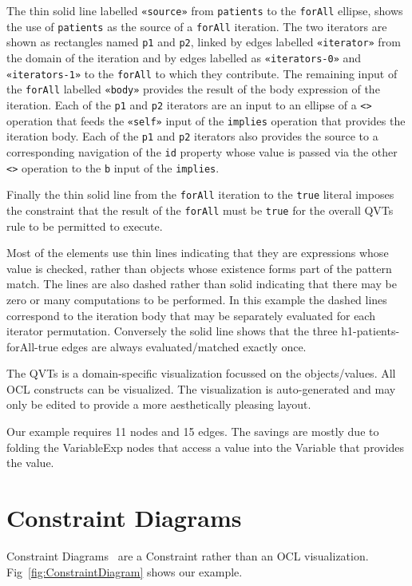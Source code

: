 \documentclass{llncs}
\begin{document}
The thin solid line labelled \verb$«source»$ from \verb$patients$ to the \verb$forAll$ ellipse, shows the use of \verb$patients$ as the source of a \verb$forAll$ iteration. The two iterators are shown as rectangles named \verb$p1$ and \verb$p2$, linked by edges labelled \verb$«iterator»$ from the domain of the iteration and by edges labelled as \verb$«iterators-0»$ and \verb$«iterators-1»$ to the \verb$forAll$ to which they contribute. The remaining input of the \verb$forAll$ labelled \verb$«body»$ provides the result of the body expression of the iteration. Each of the \verb$p1$ and \verb$p2$ iterators are an input to an ellipse of a \verb$<>$ operation that feeds the \verb$«self»$ input of the \verb$implies$ operation that provides the iteration body. Each of the \verb$p1$ and \verb$p2$ iterators also provides the source to a corresponding navigation of the \verb$id$ property whose value is passed via the other \verb$<>$ operation to the \verb$b$ input of the \verb$implies$.

Finally the thin solid line from the \verb$forAll$ iteration to the \verb$true$ literal imposes the constraint that the result of the \verb$forAll$ must be \verb$true$ for the overall QVTs rule to be permitted to execute.

Most of the elements use thin lines indicating that they are expressions whose value is checked, rather than objects whose existence forms part of the pattern match. The lines are also dashed rather than solid indicating that there may be zero or many computations to be performed. In this example the dashed lines correspond to the iteration body that may be separately evaluated for each iterator permutation. Conversely the solid line shows that the three h1-patients-forAll-true edges are always evaluated/matched exactly once.

The QVTs is a domain-specific visualization focussed on the objects/values. All OCL constructs can  be visualized. The visualization is auto-generated and may only be edited to provide a more aesthetically pleasing layout.

Our example requires 11 nodes and 15 edges. The savings are mostly due to folding the VariableExp nodes that access a value into the Variable that provides the value.

\section{Constraint Diagrams}\label{Constraint Diagrams}

Constraint Diagrams~\cite{Constraint-Diagrams} are a Constraint rather than an OCL visualization. Fig~\ref{fig:ConstraintDiagram} shows our example.
\end{document}
